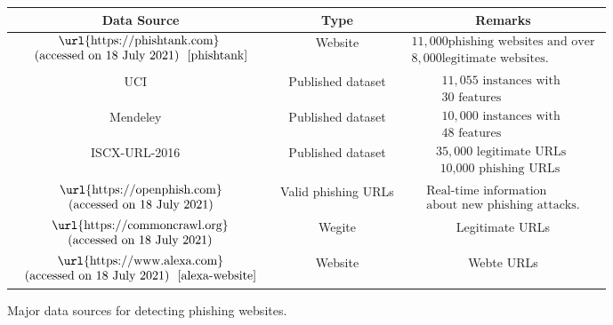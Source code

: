 \documentclass[final]{cvpr}
\begin{document}
\begin{figure}
   \begin{center}
      \begin{tabular}{ccc}
         \hline
         Data Source & Type & Remarks \\
         \hline
         $\begin{array}{c}\text {\url{https://phishtank.com} } \\ \text { (accessed on 18 July 2021) ~\cite{phishtank} }\end{array}$ & Website & $\begin{array}{c}11,000 \text{phishing websites and over} \\ 8,000 \text{legitimate websites.}\end{array}$\\
         \hline
         UCI ~\cite{mohammad2015uci} & Published dataset & $\begin{array}{c}11,055 \text { instances with } \\ 30 \text { features }\end{array}$ \\
         \hline
         Mendeley ~\cite{tan2018phishing} & Published dataset & $\begin{array}{c}10,000 \text { instances with } \\ 48 \text { features }\end{array}$ \\
         \hline
         ISCX-URL-2016 ~\cite{unb-url2016} & Published dataset & $\begin{array}{c}35,000 \text { legitimate URLs } \\ \text { 10,000 phishing URLs }\end{array}$ \\
         \hline
         $\begin{array}{c}\text {\url{https://openphish.com}} \\ \text { (accessed on 18 July 2021) }\end{array}$ & Valid phishing URLs & $\begin{array}{c} \text{Real-time information} \\ \text{about new phishing attacks.}\end{array}$ \\
         \hline
         $\begin{array}{c}\text { \url{https://commoncrawl.org} } \\ \text { (accessed on 18 July 2021) }\end{array}$ & Wegite & Legitimate URLs \\
         \hline
         $\begin{array}{c}\text {\url{https://www.alexa.com}} \\ \text { (accessed on 18 July 2021) ~\cite{alexa-website} }\end{array}$ & Website & Webte URLs \\
         \hline
         \end{tabular}
   \end{center}
      \caption{Major data sources for detecting phishing websites.}
   \label{tab:dataset}
   \end{figure}
\end{document}
